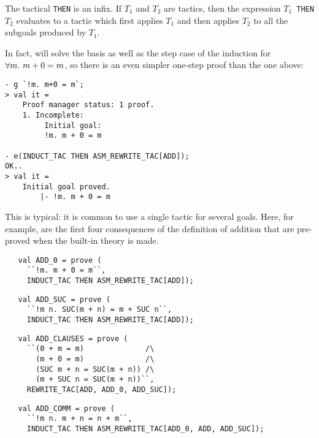 The tactical {\small\verb|THEN|} is an \ML{} infix. If $T_1$ and $T_2$
are tactics, then the \ML{} expression $T_1${\small\verb| THEN |}$T_2$
evaluates to a tactic which first applies $T_1$ and then applies $T_2$
to all the subgoals produced by $T_1$.

In fact,  will solve the basis as well as
the step case of the induction for $\forall m.\ m+0=m$, so there is an
even simpler one-step proof than the one above:
\setcounter{sessioncount}{0}
\begin{session}\begin{verbatim}
- g `!m. m+0 = m`;
> val it =
    Proof manager status: 1 proof.
    1. Incomplete:
         Initial goal:
         !m. m + 0 = m

- e(INDUCT_TAC THEN ASM_REWRITE_TAC[ADD]);
OK..
> val it =
    Initial goal proved.
        |- !m. m + 0 = m
\end{verbatim}\end{session}

\noindent This is typical: it is common to use a single tactic for several
goals. Here, for example, are the first four consequences of the
definition  of addition that are pre-proved when the built-in
theory  \HOL{} is made.

\begin{hol}\begin{verbatim}
   val ADD_0 = prove (
     ``!m. m + 0 = m``,
     INDUCT_TAC THEN ASM_REWRITE_TAC[ADD]);
\end{verbatim}\end{hol}

\begin{hol}\begin{verbatim}
   val ADD_SUC = prove (
     ``!m n. SUC(m + n) = m + SUC n``,
     INDUCT_TAC THEN ASM_REWRITE_TAC[ADD]);
\end{verbatim}\end{hol}

\begin{hol}\begin{verbatim}
   val ADD_CLAUSES = prove (
     ``(0 + m = m)              /\
       (m + 0 = m)              /\
       (SUC m + n = SUC(m + n)) /\
       (m + SUC n = SUC(m + n))``,
     REWRITE_TAC[ADD, ADD_0, ADD_SUC]);
\end{verbatim}\end{hol}

\begin{hol}\begin{verbatim}
   val ADD_COMM = prove (
     ``!m n. m + n = n + m``,
     INDUCT_TAC THEN ASM_REWRITE_TAC[ADD_0, ADD, ADD_SUC]);
\end{verbatim}\end{hol}


